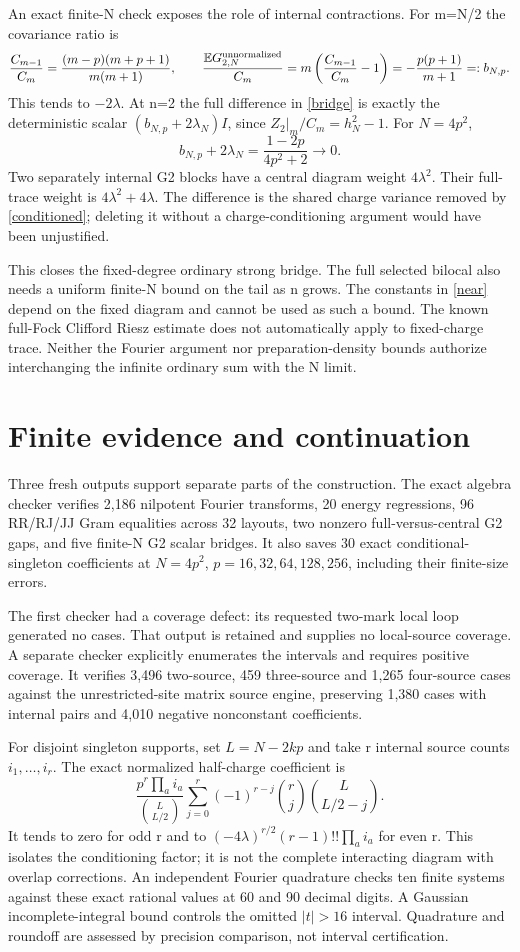\documentclass[11pt]{article}
\newcommand{\E}{\mathbb E}
\begin{document}
An exact finite-N check exposes the role of internal contractions.
For m=N/2 the covariance ratio is
\[
 \frac{C_{m-1}}{C_m}
 =\frac{(m-p)(m+p+1)}{m(m+1)},\qquad
 \frac{\E G_{2,N}^{\rm unnormalized}}{C_m}
 =m\left(\frac{C_{m-1}}{C_m}-1\right)
 =-\frac{p(p+1)}{m+1}=:b_{N,p}.
\]
This tends to $-2\lambda$. At n=2 the full difference in
\eqref{bridge} is exactly the deterministic scalar
$(b_{N,p}+2\lambda_N)I$, since $Z_2|_m/C_m=h_N^2-1$.
For $N=4p^2$,
\[
 b_{N,p}+2\lambda_N=\frac{1-2p}{4p^2+2}\longrightarrow0.
\]
Two separately internal G2 blocks have a central diagram weight
$4\lambda^2$. Their full-trace weight is $4\lambda^2+4\lambda$.
The difference is the shared charge variance removed by
\eqref{conditioned}; deleting it without a charge-conditioning
argument would have been unjustified.

This closes the fixed-degree ordinary strong bridge. The full selected
bilocal also needs a uniform finite-N bound on the tail as n grows.
The constants in \eqref{near} depend on the fixed diagram and cannot
be used as such a bound. The known full-Fock Clifford Riesz estimate
\cite{belp} does not automatically apply to fixed-charge trace.
Neither the Fourier argument nor preparation-density bounds authorize
interchanging the infinite ordinary sum with the N limit.

\newpage
\section{Finite evidence and continuation}
Three fresh outputs support separate parts of the construction.
The exact algebra checker verifies 2,186 nilpotent Fourier transforms,
20 energy regressions, 96 RR/RJ/JJ Gram equalities across 32 layouts,
two nonzero full-versus-central G2 gaps, and five finite-N G2 scalar
bridges. It also saves 30 exact conditional-singleton coefficients
at $N=4p^2$, $p=16,32,64,128,256$, including their finite-size errors.

The first checker had a coverage defect: its requested two-mark
local loop generated no cases. That output is retained and supplies
no local-source coverage. A separate checker explicitly enumerates
the intervals and requires positive coverage. It verifies 3,496
two-source, 459 three-source and 1,265 four-source cases against the
unrestricted-site matrix source engine, preserving 1,380 cases with
internal pairs and 4,010 negative nonconstant coefficients.

For disjoint singleton supports, set $L=N-2kp$ and take r internal
source counts $i_1,\ldots,i_r$. The exact normalized half-charge
coefficient is
\[
 \frac{p^r\prod_a i_a}{\binom L{L/2}}
 \sum_{j=0}^r(-1)^{r-j}\binom rj\binom L{L/2-j}.
\]
It tends to zero for odd r and to
$(-4\lambda)^{r/2}(r-1)!!\prod_a i_a$ for even r. This isolates the
conditioning factor; it is not the complete interacting diagram with
overlap corrections. An independent Fourier quadrature checks ten
finite systems against these exact rational values at 60 and 90
decimal digits. A Gaussian incomplete-integral bound controls the
omitted $|t|>16$ interval. Quadrature and roundoff are assessed by
precision comparison, not interval certification.
\end{document}
